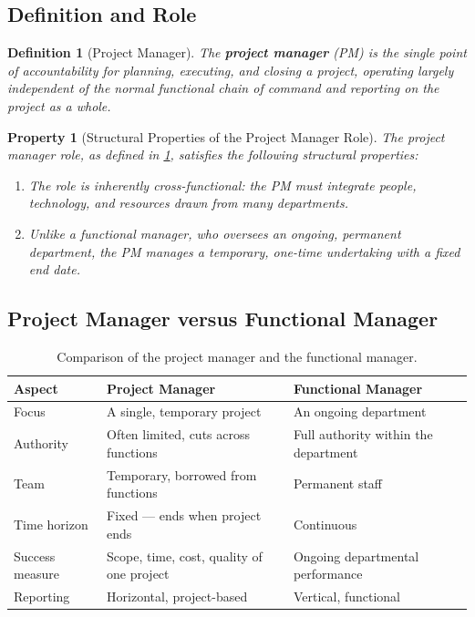 \documentclass[12pt, a4paper]{report}
\theoremstyle{engnotes}
\newtheorem{defn}{Definition}[section]
\newtheorem{property}{Property}[section]
\begin{document}
\subsection{Definition and Role}
\label{subsec:pm_role}

\begin{defn}[Project Manager]\label{def:project_manager}
    The \textbf{project manager} (PM) is the single point of accountability for planning, executing, and closing a project, operating largely independent of the normal functional chain of command and reporting on the project as a whole.
\end{defn}

\begin{property}[Structural Properties of the Project Manager Role]\label{pty:pm_structural_properties}
    The project manager role, as defined in \cref{def:project_manager}, satisfies the following structural properties:
    \begin{enumerate}
        \item The role is inherently cross-functional: the PM must integrate people, technology, and resources drawn from many departments.
        \item Unlike a functional manager, who oversees an ongoing, permanent department, the PM manages a temporary, one-time undertaking with a fixed end date.
    \end{enumerate}
\end{property}

\subsection{Project Manager versus Functional Manager}
\label{subsec:pm_vs_fm}

\begin{table}[H]
    \centering
    \caption{Comparison of the project manager and the functional manager.}
    \label{tab:pm_vs_fm}
    \begin{tabularx}{\textwidth}{l X X}
        \toprule
        \textbf{Aspect} & \textbf{Project Manager} & \textbf{Functional Manager} \\
        \midrule
        Focus & A single, temporary project & An ongoing department \\
        Authority & Often limited, cuts across functions & Full authority within the department \\
        Team & Temporary, borrowed from functions & Permanent staff \\
        Time horizon & Fixed --- ends when project ends & Continuous \\
        Success measure & Scope, time, cost, quality of one project & Ongoing departmental performance \\
        Reporting & Horizontal, project-based & Vertical, functional \\
        \bottomrule
    \end{tabularx}
\end{table}
\end{document}
